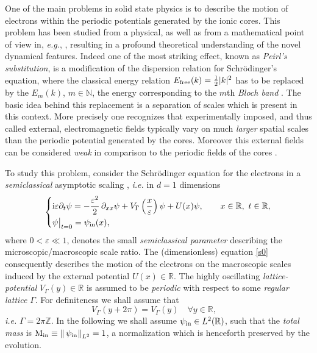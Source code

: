 \documentclass[leqno,final]{siamltex}
\numberwithin{equation}{section}
\newcounter{me}
\begin{document}
One of the main problems in solid state physics is to describe the
motion of electrons within the periodic potentials generated by
the ionic cores. This problem has been studied from a physical, as
well as from a mathematical point of view in, {{\sl e.g.\/}}, \cite{AsKn, Bl,
Lu, PST, Za}, resulting in a profound theoretical understanding of
the novel dynamical features. Indeed one of the most striking
effect, known as \emph{Peirl's substitution}, is a modification of
the dispersion relation for Schr\"odinger's equation, where the
classical energy relation $E_{\rm free}(k) = \frac{1}{2}|k|^2$ has
to be replaced by the $E_m(k)$, $m\in {{\mathbb N }}$, the  energy
corresponding to the $m$th \emph{Bloch band} \cite{B}. The basic
idea behind this replacement is a separation of scales which is
present in this context. More precisely one recognizes that
experimentally imposed, and thus called external, electromagnetic
fields typically vary on much \emph{larger} spatial scales than
the periodic potential generated by the cores. Moreover this
external fields can be considered \emph{weak} in comparison to the
periodic fields of the cores \cite{AsMe}.

To study this problem, consider the  Schr\"odinger equation for
the electrons in a \emph{semiclassical} asymptotic scaling
\cite{CMS, PST, Te}, {{\sl i.e.\/ }} in $d=1$ dimensions
\begin{equation}\label{s0}
\left \{
\begin{aligned}
& {\mathrm{i}} {{\varepsilon }}   \partial_t  \psi   = -{\frac{{{{\varepsilon }}^2}}{{2}}} \, {\partial}_{xx}  \psi+
V_{\Gamma}\left({\frac{{x}}{{{\varepsilon }}}}\right)\psi+U(x)\psi ,\qquad x \in {{\mathbb R}}, \ t\in {{\mathbb R}},\\
& \psi\big |_{t=0}=\psi_{\rm in}(x),
\end{aligned}
\right.
\end{equation}
where $0<{{\varepsilon }} \ll 1$, denotes the small \emph{semiclassical
parameter} describing the microscopic/macroscopic scale ratio. The
(dimensionless) equation \eqref{s0} consequently describes the
motion of the electrons on the macroscopic scales induced by the
external potential $U(x)\in {{\mathbb R}}$. The highly oscillating
\emph{lattice-potential} $V_{\Gamma}(y)\in {{\mathbb R}}$ is assumed to be
\emph{periodic} with respect to some \emph{regular lattice} ${\Gamma}
$. For definiteness we shall assume that \begin{equation}\label{lp0}
V_{\Gamma}(y+2\pi )=V_{\Gamma}(y) \quad {\forall} y\in {{\mathbb R}}, \quad \end{equation} {{\sl i.e.\/ }} $\Gamma =
2 \pi {{\mathbb Z }}$. In the following we shall assume $\psi_{\rm in}\in
L^2({{\mathbb R}})$, such that the \emph{total mass} is $\mathrm M_{\rm
in}\equiv {\| \, \psi_{\rm in} \|}_{L^2}=1$, a normalization which
is henceforth preserved by the evolution.
\end{document}
